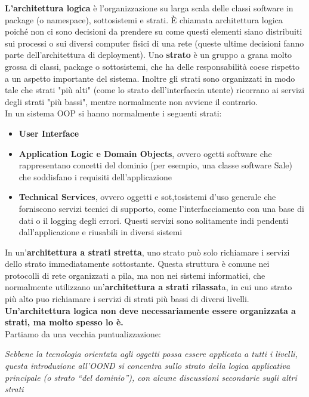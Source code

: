 \documentclass[a4paper,12pt, oneside]{book}
\begin{document}
\textbf{L'architettura logica} è l'organizzazione su larga scala delle classi software in package
(o namespace), sottosistemi e strati. È chiamata architettura logica poiché non ci sono
decisioni da prendere su come questi elementi siano distribuiti sui processi o sui diversi
computer fisici di una rete (queste ultime decisioni fanno parte dell'architettura di deployment). Uno\textbf{ strato} è un gruppo a grana molto grossa di classi, package o sottosistemi, che ha
delle responsabilità coese rispetto a un aspetto importante del sistema. Inoltre gli strati
sono organizzati in modo tale che strati "più alti" (come lo strato dell'interfaccia utente)
ricorrano ai servizi degli strati "più bassi", mentre normalmente non avviene il contrario.\\
In un sistema OOP si hanno normalmente i seguenti strati:
\begin{itemize}
\item \textbf{User Interface}
\item \textbf{Application Logic e Domain Objects}, ovvero ogetti software che rappresentano
  concetti del dominio (per esempio, una classe software Sale) che soddisfano i requisiti dell'applicazione
\item \textbf{Technical Services}, ovvero oggetti e sot,tosistemi d'uso generale che
forniscono servizi tecnici di supporto, come l'interfacciamento con una base di dati
o il logging degli errori. Questi servizi sono solitamente indi pendenti dall'applicazione e riusabili in diversi sistemi
\end{itemize}
In un'\textbf{architettura a strati stretta}, uno strato può solo richiamare i servizi dello strato
immediatamente sottostante. Questa struttura è comune nei protocolli di rete organizzati
a pila, ma non nei sistemi informatici, che normalmente utilizzano un'\textbf{architettura
a strati rilassat}a, in cui uno strato più alto puo richiamare i servizi di strati più bassi di
diversi livelli.\\
\textbf{Un'architettura logica non deve necessariamente essere organizzata a strati, ma molto spesso lo è.}\\
Partiamo da una vecchia puntualizzazione:
\begin{center}
\textit{Sebbene la tecnologia orientata agli oggetti possa essere applicata a tutti i livelli, questa
introduzione all'OOND si concentra sullo strato della logica applicativa principale
(o strato ``del dominio''), con alcune discussioni secondarie sugli altri strati}
\end{center}
\end{document}
